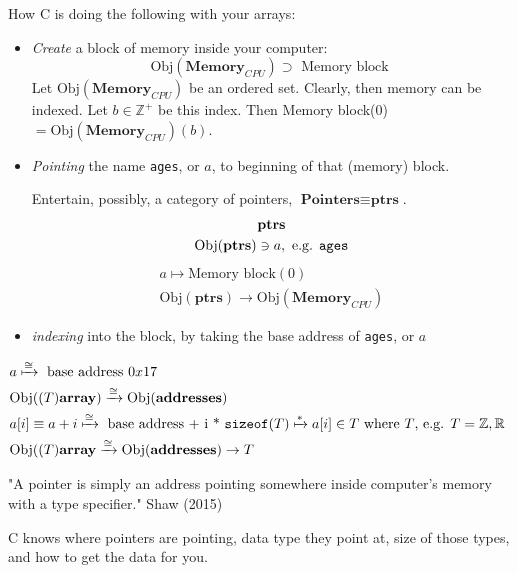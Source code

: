 \documentclass[10pt]{amsart}
\begin{document}
How C is doing the following with your arrays:  

\begin{itemize}
	\item \emph{Create} a block of memory inside your computer:  
	\[
	\text{Obj}{(\textbf{Memory}_{CPU})} \supset \text{ Memory block }  
	\]
	Let $\text{Obj}{(\textbf{Memory}_{CPU})}$ be an ordered set.  Clearly, then memory can be indexed.  Let $b\in \mathbb{Z}^+$ be this index.  Then Memory block(0) $= \text{Obj}{(\textbf{Memory}_{CPU})}(b)$.  		
	\item \emph{Pointing} the name \verb|ages|, or $a$, to beginning of that (memory) block.  
	
	Entertain, possibly, a category of pointers, $\textbf{Pointers} \equiv \textbf{ptrs}$.  
	\[
	\begin{gathered}
	\textbf{ptrs} \\
	\text{Obj}{(\textbf{ptrs})} \ni a, \text{ e.g. } \verb|ages|  
	\end{gathered}
	\]	
	\[
	\begin{gathered}
	a \mapsto \text{Memory block}(0) \\ 
	\text{Obj}{(\textbf{ptrs})} \to \text{Obj}{(\textbf{Memory}_{CPU})}
	\end{gathered}
	\]
	\item \emph{indexing} into the block, by taking the base address of \verb|ages|, or $a$ 
\end{itemize}

\[
\begin{gathered}
\begin{aligned}
&	a \xmapsto{ \cong } \text{ base address $0x17$ } \\
&	\text{Obj}{((T)\textbf{array})} \xrightarrow{ \cong } \text{Obj}{(\textbf{addresses})}  \\	
&	a[i] \equiv a+i \xmapsto{ \cong } \text{ base address + i * } \verb|sizeof|(T)  \xmapsto{ * } a[i] \in T \text{ where $T$, e.g. $T = \mathbb{Z},\mathbb{R}$ } \\ 
& \text{Obj}{((T)\textbf{array}} \xrightarrow{ \cong } \text{Obj}{(\textbf{addresses})} \to T  
\end{aligned}
\end{gathered}
\]

"A pointer is simply an address pointing somewhere inside computer's memory with a type specifier."  Shaw (2015) \cite{Shaw2015}


C knows where pointers are pointing, data type they point at, size of those types, and how to get the data for you.  
\end{document}
